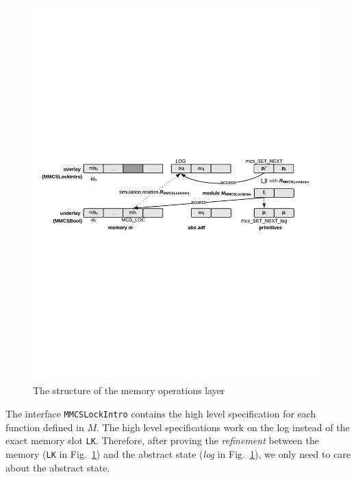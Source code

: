 \begin{figure}
\begin{center}
\includegraphics[width=\linewidth]{figs/mcslock/layer3}
\end{center}
\caption{The structure of the memory operations layer}
\label{fig:layer-struct-mcs-verification}
\end{figure}

The interface \texttt{MMCSLockIntro} contains the high level specification for each function defined in $M$. 
The high level specifications work on the log instead of the exact memory slot \lstinline$LK$.
Therefore, after proving the {\em refinement} between the memory (\lstinline$LK$ in Fig.~\ref{fig:layer-struct-mcs-verification})
and the abstract state (\emph{log} in Fig.~\ref{fig:layer-struct-mcs-verification}), we only need to care about the abstract state.

